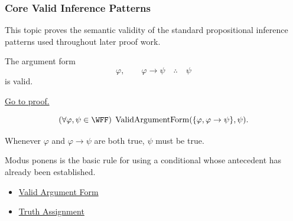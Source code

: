 \subsubsection*{Core Valid Inference Patterns}

\begin{remark*}
This topic proves the semantic validity of the standard propositional inference
patterns used throughout later proof work.
\end{remark*}

\begin{tcolorbox}[colback=thmbox, colframe=thmborder, arc=2pt,
  left=6pt, right=6pt, top=4pt, bottom=4pt,
  title={\small\textbf{Theorem (Modus Ponens is Valid)}},
  fonttitle=\small\bfseries]
\begin{theorem}
\label{thm:modus-ponens-validity-propositional-logic}
The argument form
\[
\varphi,\qquad \varphi\to\psi \quad\therefore\quad \psi
\]
is valid.

\noindent\hyperref[prf:modus-ponens-validity-propositional-logic]{Go to proof.}
\end{theorem}
\end{tcolorbox}

\begin{remark*}
\[
(\forall\varphi,\psi\in\WFF)\;\operatorname{ValidArgumentForm}(\{\varphi,\varphi\to\psi\},\psi).
\]
\end{remark*}

\begin{remark*}
Whenever \(\varphi\) and \(\varphi\to\psi\) are both true, \(\psi\) must be true.
\end{remark*}

\begin{remark*}[Interpretation]
Modus ponens is the basic rule for using a conditional whose antecedent has
already been established.
\end{remark*}

\begin{dependencies}
\begin{itemize}
  \item \hyperref[def:valid-argument-form-propositional-logic]{Valid Argument Form}
  \item \hyperref[def:truth-assignment-propositional-logic]{Truth Assignment}
\end{itemize}
\end{dependencies}

